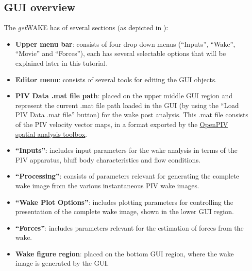 \documentclass[12pt,a4paper]{article}
\begin{document}
\newpage
\subsection{GUI overview}

The \textit{get}WAKE has of several sections (as depicted in ):
\begin{itemize}
\item {\color{red}\textbf{Upper menu bar}}: consists of four drop-down menus (``Inputs'', ``Wake'', ``Movie'' and ``Forces''), each has several selectable options that will be explained later in this tutorial.
\item {\color{cyan}\textbf{Editor menu}}: consists of several tools for editing the GUI objects.
\item {\color{blue}\textbf{PIV Data .mat file path}}: placed on the upper middle GUI region and represent the current .mat file path loaded in the GUI (by using the ``Load PIV Data .mat file'' button) for the wake post analysis. This .mat file consists of the PIV velocity vector maps, in a format exported by the \href{https://github.com/OpenPIV/openpiv-spatial-analysis-toolbox}{OpenPIV spatial analysis toolbox}.
\item {\color{brown}\textbf{``Inputs''}}: includes input parameters for the wake analysis in terms of the PIV apparatus, bluff body characteristics and flow conditions.
\item {\color{green}\textbf{``Processing''}}: consists of parameters relevant for generating the complete wake image from the various instantaneous PIV wake images.
\item {\color{magenta}\textbf{``Wake Plot Options''}}: includes plotting parameters for controlling the presentation of the complete wake image, shown in the lower GUI region.
\item {\color{orange}\textbf{``Forces''}}: includes parameters relevant for the estimation of forces from the wake.
\item {\color{black}\textbf{Wake figure region}}: placed on the bottom GUI region, where the wake image is generated by the GUI.
\end{itemize}
\end{document}
